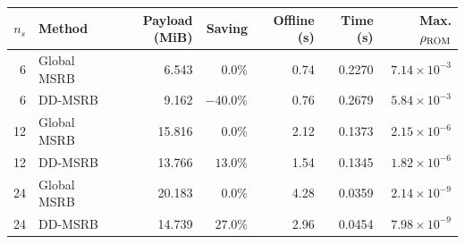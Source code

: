 \begin{tabular}{rlrrrrr}\toprule
$n_s$ & Method & Payload (MiB) & Saving & Offline (s) & Time (s) & Max. $\rho_{\rm ROM}$ \\
\midrule
6 & Global MSRB & 6.543 & \(0.0\%\) & 0.74 & 0.2270 & \(7.14\times10^{-3}\) \\
6 & DD-MSRB & 9.162 & \(-40.0\%\) & 0.76 & 0.2679 & \(5.84\times10^{-3}\) \\
12 & Global MSRB & 15.816 & \(0.0\%\) & 2.12 & 0.1373 & \(2.15\times10^{-6}\) \\
12 & DD-MSRB & 13.766 & \(13.0\%\) & 1.54 & 0.1345 & \(1.82\times10^{-6}\) \\
24 & Global MSRB & 20.183 & \(0.0\%\) & 4.28 & 0.0359 & \(2.14\times10^{-9}\) \\
24 & DD-MSRB & 14.739 & \(27.0\%\) & 2.96 & 0.0454 & \(7.98\times10^{-9}\) \\
\bottomrule\end{tabular}
